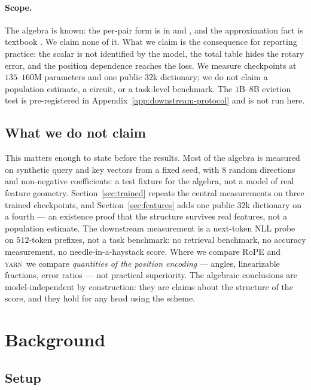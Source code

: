 \documentclass{article}
\theoremstyle{plain}
\theoremstyle{remark}
\newcommand{\yarn}{\textsc{yarn}}
\begin{document}
\paragraph{Scope.} The algebra is known: the per-pair form is in
\citet{chachamovits2026phase} and \citet{liang2026roaware}, and the
approximation fact is textbook \citep{powell1981approximation}. We claim none of
it. What we claim is the consequence for reporting practice: the scalar is not
identified by the model, the total table hides the rotary error, and the
position dependence reaches the loss. We measure checkpoints at
$135$--$160$M parameters and
one public $32$k dictionary; we do not claim a population estimate, a circuit,
or a task-level benchmark. The $1$B--$8$B eviction test is pre-registered in
Appendix~\ref{app:downstream-protocol} and is not run here.

\subsection{What we do not claim}

This matters enough to state before the results. Most of the algebra is measured
on synthetic query and key vectors from a fixed seed, with $8$ random
directions and non-negative coefficients: a test fixture for the algebra, not a
model of real feature geometry. Section~\ref{sec:trained} repeats the central measurements on three
trained checkpoints, and Section~\ref{sec:features} adds one public $32$k
dictionary on a fourth --- an existence proof that the structure survives real
features, not a population estimate. The downstream measurement is a next-token
NLL probe on $512$-token prefixes, not a task benchmark: no retrieval benchmark,
no accuracy measurement, no needle-in-a-haystack score. Where we compare RoPE
and \yarn\ we compare \emph{quantities of the position encoding} --- angles,
linearizable fractions, error ratios --- not practical superiority. The
algebraic conclusions are model-independent by construction: they are claims
about the structure of the score, and they hold for any head using the scheme.

\section{Background}
\label{sec:background}

\subsection{Setup}
\end{document}
